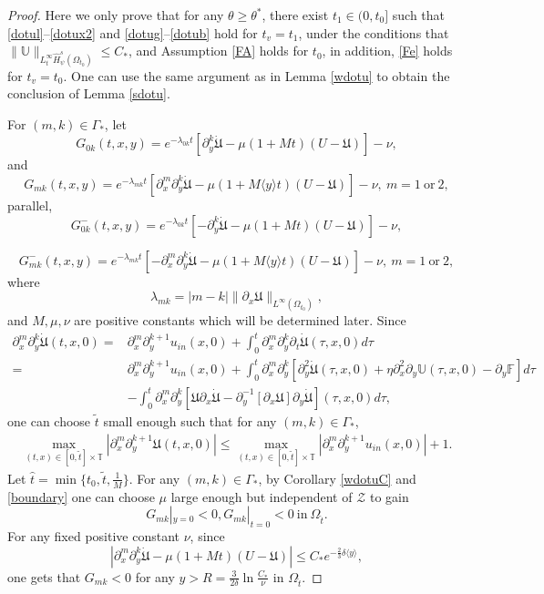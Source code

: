 \documentclass{amsart}
\numberwithin{equation}{section}
\newcommand\y{{{\langle y \rangle}}}
\begin{document}
\begin{proof}
Here we only prove that for any $\theta\geq \theta^{*}$, there exist $t_{1}\in(0,t_{0}]$ such that \eqref{dotul}--\eqref{dotux2} and \eqref{dotug}--\eqref{dotub} hold for $t_{v}=t_{1}$, under the conditions that $\|\mathbb{U}\|_{L_{t}^{\infty}\hat{H}_{\psi}^{s}(\Omega_{t_{0}})}\leq C_{*}$, and Assumption \ref{FA} holds for $t_{0}$, in addition, \eqref{Fe} holds for $t_{v}=t_{0}$. One can use the same argument as in Lemma \ref{wdotu} to obtain the conclusion of Lemma \ref{sdotu}.




For $(m,k)\in\Gamma_{*}$, let
    $$G_{0k}(t,x,y)=e^{-\lambda_{0k}t}\left[\partial_{y}^{k}\dot{\mathfrak{U}}-\mu(1+Mt)(U-\mathfrak{U})\right]-\nu,$$
and
$$G_{mk}(t,x,y)=e^{-\lambda_{mk}t}\left[\partial_{x}^{m}\partial_{y}^{k}\dot{\mathfrak{U}}-\mu(1+M\y t)(U-\mathfrak{U})\right]-\nu,~m=1~\text{or}~2,$$
parallel,
    $$G_{0k}^{-}(t,x,y)=e^{-\lambda_{0k}t}\left[-\partial_{y}^{k}\dot{\mathfrak{U}}-\mu(1+Mt)(U-\mathfrak{U})\right]-\nu,$$

$$G_{mk}^{-}(t,x,y)=e^{-\lambda_{mk}t}\left[-\partial_{x}^{m}\partial_{y}^{k}\dot{\mathfrak{U}}-\mu(1+M\y t)(U-\mathfrak{U})\right]-\nu,~m=1~\text{or}~2,$$
where $$\lambda_{mk}=|m-k|\|\partial_{x}\mathfrak{U}\|_{L^{\infty}(\Omega_{t_{0}})},$$
and $M,\mu,\nu$ are positive constants which will be determined later.
Since
\begin{align*}
\partial_{x}^{m}\partial_{y}^{k}\dot{\mathfrak{U}}(t,x,0)
=& \partial_{x}^{m}\partial_{y}^{k+1}u_{in}(x,0)
  +\int_{0}^{t}\partial_{x}^{m}\partial_{y}^{k}\partial_{t}\dot{\mathfrak{U}}(\tau,x,0)d\tau\\
=& \partial_{x}^{m}\partial_{y}^{k+1}u_{in}(x,0)
  +\int_{0}^{t}\partial_{x}^{m}\partial_{y}^{k}[\partial_{y}^{2}\dot{\mathfrak{U}}(\tau,x,0)+\eta\partial_{x}^{2}\partial_{y}\mathbb{U}(\tau,x,0)-\partial_{y}\mathbb{F}]d\tau\\
 &-\int_{0}^{t}\partial_{x}^{m}\partial_{y}^{k}[\mathfrak{U}\partial_{x}\dot{\mathfrak{U}}-\partial_{y}^{-1}[\partial_{x}\mathfrak{U}]\partial_{y}\dot{\mathfrak{U}}](\tau,x,0)d\tau,
\end{align*}
one can choose $\tilde{t}$ small enough such that for any $(m,k)\in\Gamma_{*}$,
\begin{align}\label{boundary}
\max_{(t,x)\in[0,\tilde{t}]\times\mathbb{T}}|\partial_{x}^{m}\partial_{y}^{k+1}\mathfrak{U}(t,x,0)|
\leq \max_{(t,x)\in[0,\tilde{t}]\times\mathbb{T}}|\partial_{x}^{m}\partial_{y}^{k+1}u_{in}(x,0)|+1.
\end{align}
Let $\hat{t}=\min\{t_{0},\tilde{t},\frac{1}{M}\}$. For any $(m,k)\in\Gamma_{*}$, by Corollary \ref{wdotuC} and \eqref{boundary} one can choose $\mu$ large enough but independent of $\mathcal{Z}$ to gain
$$G_{mk}|_{y=0}<0, G_{mk}|_{t=0}<0 ~\text{in}~\Omega_{\hat{t}}.$$
For any fixed positive constant $\nu$, since
$$|\partial_{x}^{m}\partial_{y}^{k}\dot{\mathfrak{U}}-\mu(1+Mt)(U-\mathfrak{U})|\leq C_{*}e^{-\frac{2}{3}\delta\y},$$
one gets that $G_{mk}<0$ for any $y>R=\frac{3}{2\delta}\ln{\frac{C_{*}}{\nu}}$ in $\Omega_{\hat{t}}$.


\end{proof}
\end{document}
